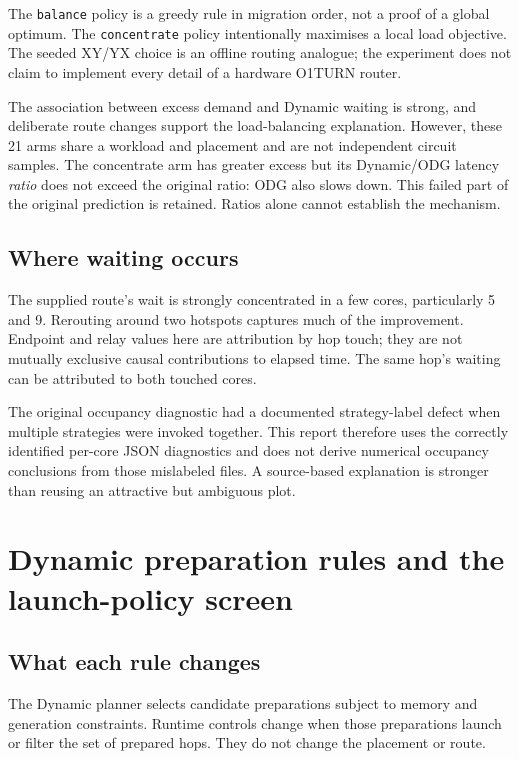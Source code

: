 \documentclass[11pt,a4paper,oneside]{report}
\begin{document}
The \texttt{balance} policy is a greedy rule in migration order, not a proof of a global optimum. The \texttt{concentrate} policy intentionally maximises a local load objective. The seeded XY/YX choice is an offline routing analogue; the experiment does not claim to implement every detail of a hardware O1TURN router.



The association between excess demand and Dynamic waiting is strong, and deliberate route changes support the load-balancing explanation. However, these 21 arms share a workload and placement and are not independent circuit samples. The concentrate arm has greater excess but its Dynamic/ODG latency \emph{ratio} does not exceed the original ratio: ODG also slows down. This failed part of the original prediction is retained. Ratios alone cannot establish the mechanism.

\section{Where waiting occurs}

The supplied route's wait is strongly concentrated in a few cores, particularly 5 and 9. Rerouting around two hotspots captures much of the improvement. Endpoint and relay values here are attribution by hop touch; they are not mutually exclusive causal contributions to elapsed time. The same hop's waiting can be attributed to both touched cores.

The original occupancy diagnostic had a documented strategy-label defect when multiple strategies were invoked together. This report therefore uses the correctly identified per-core JSON diagnostics and does not derive numerical occupancy conclusions from those mislabeled files. A source-based explanation is stronger than reusing an attractive but ambiguous plot.

\chapter{Dynamic preparation rules and the launch-policy screen}
\section{What each rule changes}
The Dynamic planner selects candidate preparations subject to memory and generation constraints. Runtime controls change when those preparations launch or filter the set of prepared hops. They do not change the placement or route.
\end{document}

